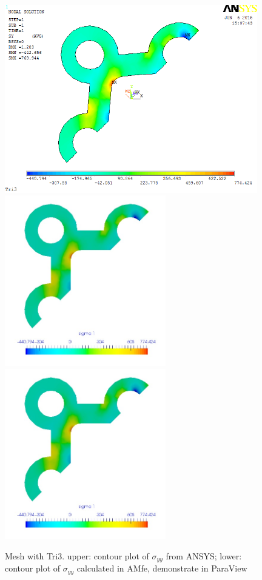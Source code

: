 \begin{figure}[htbp]
	\begin{center}
		\includegraphics[width=11cm,clip]{TTri3_Syy.png} 	
		\includegraphics[width=7cm,clip]{TTri3_Syy_PD.png} 	
		\includegraphics[width=7cm,clip]{TTri3_Syy_P.png} 		
		\caption{Mesh with Tri3. upper: contour plot of $\sigma_{yy}$ from ANSYS; lower: contour plot of $\sigma_{yy}$ calculated in AMfe, demonstrate in ParaView} \label{fig: Tri3_Syy}
	\end{center}
\end{figure}
\clearpage 

